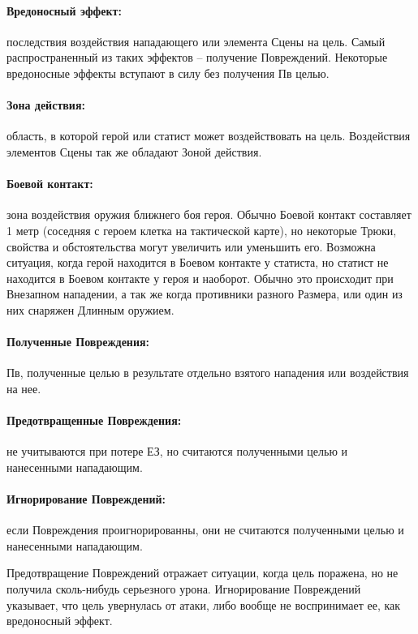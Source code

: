 \paragraph{Вредоносный эффект:} последствия воздействия нападающего или элемента Сцены на цель. Самый распространенный из таких эффектов – получение Повреждений. Некоторые вредоносные эффекты вступают в силу без получения Пв целью.
\paragraph{Зона действия:} область, в которой герой или статист может воздействовать на цель. Воздействия элементов Сцены так же обладают Зоной действия.
\paragraph{Боевой контакт:} зона воздействия оружия ближнего боя героя. Обычно Боевой контакт составляет 1 метр (соседняя с героем клетка на тактической карте), но некоторые Трюки, свойства и обстоятельства могут увеличить или уменьшить его.
\newline Возможна ситуация, когда герой находится в Боевом контакте у статиста, но статист не находится в Боевом контакте у героя и наоборот. Обычно это происходит при Внезапном нападении, а так же когда противники разного Размера, или один из них снаряжен Длинным оружием.
\paragraph{Полученные Повреждения:} Пв, полученные целью в результате отдельно взятого нападения или воздействия на нее. 
\paragraph{Предотвращенные Повреждения:} не учитываются при потере ЕЗ, но считаются полученными целью и нанесенными нападающим.
\paragraph{Игнорирование Повреждений:} если Повреждения проигнорированны, они не считаются полученными целью и нанесенными нападающим.
\begin{tcolorbox}
  Предотвращение Повреждений отражает ситуации, когда цель поражена, но не получила сколь-нибудь серьезного урона. Игнорирование Повреждений указывает, что цель увернулась от атаки, либо вообще не воспринимает ее, как вредоносный эффект.
\end{tcolorbox}


